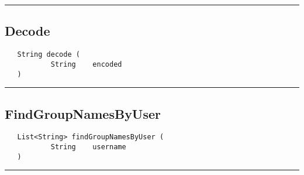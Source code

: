 \rule{15cm}{2pt}
\subsection{Decode}
\label{Api:Decode}
\begin{verbatim}
   String decode (
           String    encoded
   )
\end{verbatim}



\rule{15cm}{2pt}
\subsection{FindGroupNamesByUser}
\label{Api:FindGroupNamesByUser}
\begin{verbatim}
   List<String> findGroupNamesByUser (
           String    username
   )
\end{verbatim}



\rule{15cm}{2pt}
